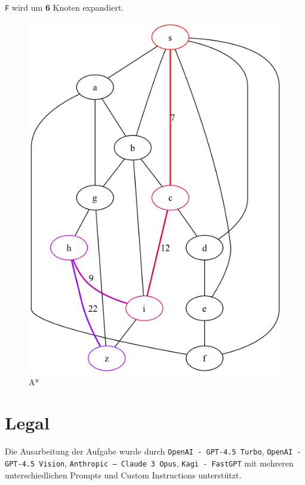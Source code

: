 \documentclass[a4paper,11pt]{report}
\begin{document}
\texttt{F} wird um \textbf{6} Knoten expandiert.

\begin{figure}[htbp]
    \centering
    \includegraphics[height=0.2\textheight]{notebooks/assets/aufgabe_05/astar}
    \caption{A*}
    \label{fig:astar_graph}
\end{figure}

\newpage



\chapter{Legal}
Die Ausarbeitung der Aufgabe wurde durch \texttt{OpenAI - GPT-4.5 Turbo}, \texttt{OpenAI - GPT-4.5 Vision}, \texttt{Anthropic -- Claude 3 Opus},  \texttt{Kagi - FastGPT} mit mehreren unterschiedlichen Prompts und Custom Instructions unterstützt.
\end{document}
